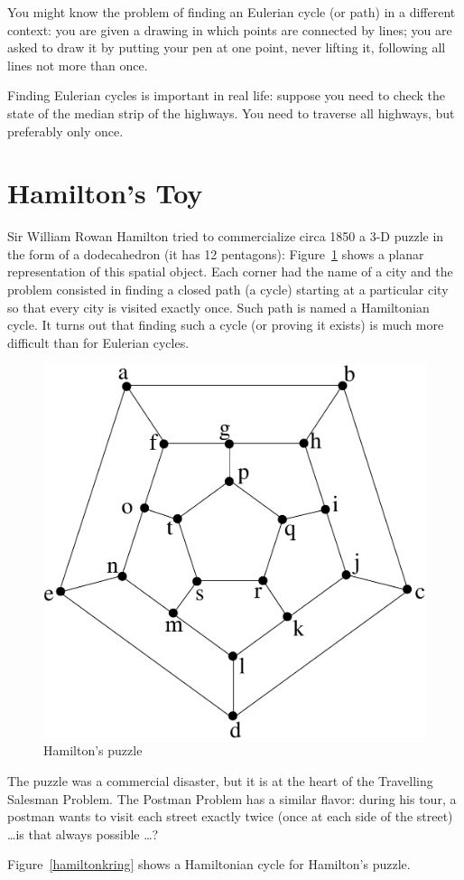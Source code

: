 You might know the problem of finding an Eulerian cycle (or path) in a
different context: you are given a drawing in which points are
connected by lines; you are asked to draw it by putting your pen at
one point, never lifting it, following all lines not more than once.

Finding Eulerian cycles is important in real life: suppose you need to
check the state of the median strip of the highways. You need to
traverse all highways, but preferably only once.

\section{Hamilton's Toy}

Sir William Rowan Hamilton tried to commercialize circa 1850 a 3-D
puzzle in the form of a dodecahedron (it has 12 pentagons):
Figure~\ref{hamilton1} shows a planar representation of this spatial
object. Each corner had the name of a city and the problem consisted
in finding a closed path (a cycle) starting at a particular city so
that every city is visited exactly once. Such path is named a
Hamiltonian cycle. It turns out that finding such a cycle (or proving
it exists) is much more difficult than for Eulerian cycles.

\begin{figure}[ht]
	\centering
	\includegraphics[width=0.4\linewidth,keepaspectratio]{hamilton}
	\caption{Hamilton's puzzle
	\label{hamilton1}}
\end{figure}

The puzzle was a commercial disaster, but it is at the heart of the
Travelling Salesman Problem.
The Postman Problem has a similar flavor: during his tour, a postman
wants to visit each street exactly twice (once at each side of the
street) \ldots is that always possible \ldots?

Figure~\ref{hamiltonkring} shows a Hamiltonian cycle for Hamilton's puzzle.

